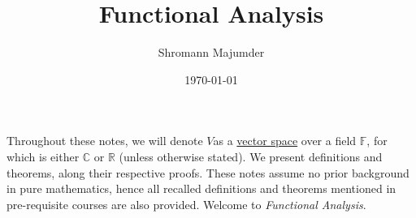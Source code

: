 \documentclass{article}
\title{Functional Analysis}
\author{Shromann Majumder}
\date{\today}
\newcommand{\R}{\mathbb{R}}
\newcommand{\C}{\mathbb{C}}
\newcommand{\F}{\mathbb{F}}
\newcommand{\V}{$V$}
\begin{document}
\maketitle

Throughout these notes, we will denote \V as a \hyperlink{https://en.wikipedia.org/wiki/Vector_space}{vector space} over a field $\F$, for which is either $\C$ or $\R$ (unless otherwise stated). We present definitions and theorems, along their respective proofs. These notes assume no prior background in pure mathematics, hence all recalled definitions and theorems mentioned in pre-requisite courses are also provided. Welcome to \emph{Functional Analysis}. 

\tableofcontents









\end{document}
